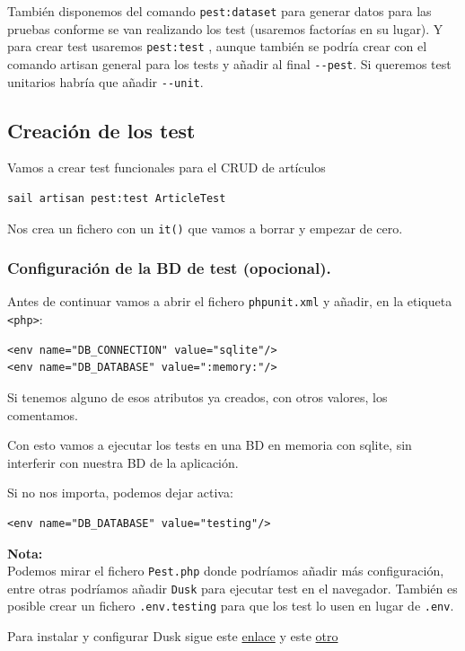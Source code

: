 \documentclass[11pt]{article}
\begin{document}
También disponemos del comando \texttt{pest:dataset} para generar datos para
las pruebas conforme se van realizando los test (usaremos factorías en
su lugar). Y para crear test usaremos \texttt{pest:test} , aunque también se
podría crear con el comando artisan general para los tests y añadir al
final \texttt{-{}-{}pest}. Si queremos test unitarios habría que añadir \texttt{-{}-{}unit}.

\subsection{Creación de los test}
\label{sec:org3a21096}
Vamos a crear test funcionales para el CRUD de artículos
\begin{verbatim}
sail artisan pest:test ArticleTest
\end{verbatim}

Nos crea un fichero con un \texttt{it()} que vamos a borrar y empezar de cero.
\subsubsection{Configuración de la BD de test (opocional).}
\label{sec:orgd1234c8}

Antes de continuar vamos a abrir el fichero \texttt{phpunit.xml} y añadir, en
la etiqueta \texttt{<php>}:
\begin{verbatim}
<env name="DB_CONNECTION" value="sqlite"/>
<env name="DB_DATABASE" value=":memory:"/>
\end{verbatim}

Si tenemos alguno de esos atributos ya creados, con otros valores, los
comentamos.

Con esto vamos a ejecutar los tests en una BD en memoria con sqlite,
sin interferir con nuestra BD de la aplicación.

Si no nos importa, podemos dejar activa:
\begin{verbatim}
<env name="DB_DATABASE" value="testing"/>
\end{verbatim}

\textbf{Nota:} \\[0pt]
Podemos mirar el fichero \texttt{Pest.php} donde podríamos añadir más
configuración, entre otras podríamos añadir \texttt{Dusk} para ejecutar test
en el navegador. También es posible crear un fichero \texttt{.env.testing}
para que los test lo usen en lugar  de \texttt{.env}.

Para instalar y configurar Dusk sigue este \href{https://laravel.com/docs/9.x/dusk}{enlace} y este \href{https://laravel.com/docs/9.x/sail\#laravel-dusk}{otro}
\end{document}
